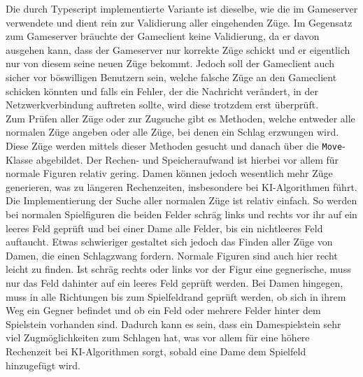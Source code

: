 \documentclass[12pt,a4paper,bibliography=totocnumbered,listof=totocnumbered]{article}
\begin{document}
Die durch Typescript implementierte Variante ist dieselbe, wie die im Gameserver verwendete und dient rein zur Validierung aller eingehenden Züge. Im Gegensatz zum Gameserver 
bräuchte der Gameclient keine Validierung, da er davon ausgehen kann, dass der Gameserver nur korrekte Züge schickt und er eigentlich nur von diesem seine 
neuen Züge bekommt. Jedoch soll der Gameclient auch sicher vor böswilligen Benutzern sein, welche falsche Züge an den Gameclient schicken könnten und falls ein Fehler,
der die Nachricht verändert, in der Netzwerkverbindung auftreten sollte, wird diese trotzdem erst überprüft.
\\
Zum Prüfen aller Züge oder zur Zugsuche gibt es Methoden, welche entweder alle normalen Züge angeben oder alle Züge, bei denen ein Schlag erzwungen wird. 
Diese Züge werden mittels dieser Methoden gesucht und danach über die \texttt{Move}-Klasse abgebildet. Der Rechen- und Speicheraufwand ist hierbei vor allem 
für normale Figuren relativ gering. Damen können jedoch wesentlich mehr Züge generieren, was zu längeren Rechenzeiten, insbesondere bei \ac{KI}-Algorithmen führt.
\\
Die Implementierung der Suche aller normalen Züge ist relativ einfach. So werden bei normalen Spielfiguren die beiden Felder schräg links und rechts vor ihr 
auf ein leeres Feld geprüft und bei einer Dame alle Felder, bis ein nichtleeres Feld auftaucht. Etwas schwieriger gestaltet sich jedoch das Finden aller 
Züge von Damen, die einen Schlagzwang fordern. Normale Figuren sind auch hier recht leicht zu finden. Ist schräg rechts oder links vor der Figur 
eine gegnerische, muss nur das Feld dahinter auf ein leeres Feld geprüft werden. Bei Damen hingegen, muss in alle Richtungen bis zum Spielfeldrand 
geprüft werden, ob sich in ihrem Weg ein Gegner befindet und ob ein Feld oder mehrere Felder hinter dem Spielstein vorhanden sind. Dadurch kann es sein, dass ein 
Damespielstein sehr viel Zugmöglichkeiten zum Schlagen hat, was vor allem für eine höhere Rechenzeit bei \ac{KI}-Algorithmen sorgt, sobald eine Dame dem Spielfeld hinzugefügt wird.
\end{document}
